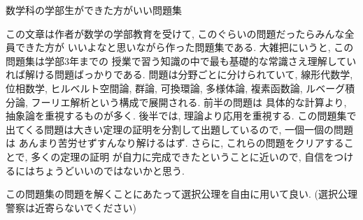 \documentclass[lualatex]{exam}
\theoremstyle{remark}
\theoremstyle{plain}
\newcommand{\jtoday}{\number \year 年 \number \month 月 \number \day 日}
\begin{document}
\centerline{\Large 数学科の学部生ができた方がいい問題集 }
\rightline{\jtoday}
\tableofcontents
この文章は作者が数学の学部教育を受けて, このぐらいの問題だったらみんな全員できた方が
いいよなと思いながら作った問題集である. 大雑把にいうと, この問題集は学部3年までの
授業で習う知識の中で最も基礎的な常識さえ理解していれば解ける問題ばっかりである.
問題は分野ごとに分けられていて, 線形代数学, 位相数学, ヒルベルト空間論, 群論, 可換環論, 多様体論, 
複素函数論, ルベーグ積分論, フーリエ解析という構成で展開される. 前半の問題は
具体的な計算より, 抽象論を重視するものが多く.
後半では, 理論より応用を重視する. 
この問題集で出てくる問題は大きい定理の証明を分割して出題しているので, 
一個一個の問題は
あんまり苦労せずすんなり解けるはず. 
さらに, これらの問題をクリアすることで, 
多くの定理の証明
が自力に完成できたということに近いので, 
自信をつけるにはちょうどいいのではないかと思う. 

この問題集の問題を解くことにあたって選択公理を自由に用いて良い. (選択公理警察は近寄らないでください)
\end{document}
